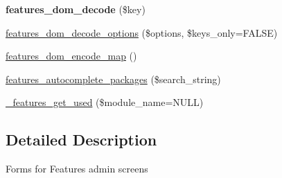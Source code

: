 \begin{DoxyCompactItemize}
\item 
\hypertarget{features_8admin_8inc_a6028b85bd632b5c3f9f4e3a474f74898}{
{\bfseries features\_\-dom\_\-decode} (\$key)}
\label{features_8admin_8inc_a6028b85bd632b5c3f9f4e3a474f74898}

\item 
\hyperlink{features_8admin_8inc_a345c3750b3d43f179d47f4346b4b24d4}{features\_\-dom\_\-decode\_\-options} (\$options, \$keys\_\-only=FALSE)
\item 
\hyperlink{features_8admin_8inc_af3d04e9b41e93d83767c38f0f5b8e0d5}{features\_\-dom\_\-encode\_\-map} ()
\item 
\hyperlink{features_8admin_8inc_a34276d58dff7308cc849f923d9fdabed}{features\_\-autocomplete\_\-packages} (\$search\_\-string)
\item 
\hyperlink{features_8admin_8inc_a76b8c6e5b86aa11400cc20a7d7e46f38}{\_\-features\_\-get\_\-used} (\$module\_\-name=NULL)
\end{DoxyCompactItemize}


\subsection{Detailed Description}
Forms for Features admin screens 

